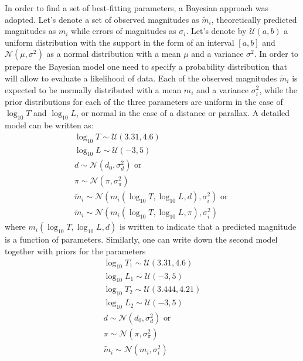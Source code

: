 \documentclass{pracalicmgr}
\begin{document}
In order to find a set of best-fitting parameters, a Bayesian approach was adopted. Let's denote a set of observed magnitudes as $\tilde{m}_i$, theoretically predicted
magnitudes as $m_i$ while errors of magnitudes as $\sigma_i$. Let's denote by $\mathcal{U}(a,b)$ a uniform distribution with the support in the form of an interval $[a,b]$ and $\mathcal{N}(\mu,\sigma^2)$ as a
normal distribution with a mean $\mu$ and a variance $\sigma^2$. In order to prepare the Bayesian model one need to specify a probability distribution that will allow to evaluate a likelihood of
data. Each of the observed magnitudes $\tilde{m}_i$ is expected to be normally distributed with a mean $m_i$ and a variance $\sigma_i^2$, while the prior distributions for each of the three parameters
are uniform in the case of $\log_{10} T$ and $\log_{10} L$, or normal in the case of a distance or parallax. A detailed model can be written as:
\begin{equation}
    \begin{split}
    \log_{10}{T}\sim \mathcal{U}(3.31,4.6)\\
    \log_{10}{L} \sim \mathcal{U}(-3,5)\\
    d \sim \mathcal{N}(d_0,\sigma_d^2) \textrm{ or } \\
    \pi \sim \mathcal{N} (\pi,\sigma_{\pi}^2)\\
    \tilde{m}_i\sim \mathcal{N}(m_i(\log_{10} T, \log_{10} L, d ),\sigma_i^2) \textrm{ or }\\
    \tilde{m}_i\sim \mathcal{N}(m_i(\log_{10} T, \log_{10} L, \pi ),\sigma_i^2)
    \end{split}
\end{equation}
where $m_i(\log_{10} T, \log_{10} L, d )$ is written to indicate that a predicted magnitude is a function of parameters. 
Similarly, one can write down the second model together with priors for the parameters
\begin{equation}
    \begin{split}
    \log_{10}{T_1}\sim \mathcal{U}(3.31,4.6)\\
    \log_{10}{L_1} \sim \mathcal{U}(-3,5)\\
    \log_{10}{T_2}\sim \mathcal{U}(3.444,4.21)\\
    \log_{10}{L_2} \sim \mathcal{U}(-3,5)\\
    d \sim \mathcal{N}(d_0,\sigma_d^2) \textrm{ or } \\
    \pi \sim \mathcal{N} (\pi,\sigma_{\pi}^2)\\
    \tilde{m}_i\sim \mathcal{N}(m_i,\sigma_i^2)
    \end{split}
\end{equation}
\end{document}
